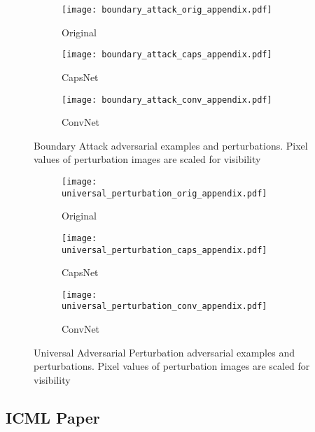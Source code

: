 \begin{figure}
	\centering
	
	\begin{subfigure}{.23\textwidth}
		\centering
		\texttt{[image: boundary\_attack\_orig\_appendix.pdf]}%
		\caption{Original}%
	\end{subfigure}%
	\begin{subfigure}{.36\textwidth}
		\centering
		\texttt{[image: boundary\_attack\_caps\_appendix.pdf]}%
		\caption{CapsNet}
	\end{subfigure}%
	\begin{subfigure}{.36\textwidth}
		\centering
		\texttt{[image: boundary\_attack\_conv\_appendix.pdf]}%
		\caption{ConvNet}
	\end{subfigure}
	\caption[Boundary Attack Adversarial Examples]{Boundary Attack adversarial examples and perturbations. Pixel values of perturbation images are scaled for visibility}
	\label{fig:boundary-img}
	
\end{figure}

\begin{figure}
	\centering
	
	\begin{subfigure}{.23\textwidth}
		\centering
		\texttt{[image: universal\_perturbation\_orig\_appendix.pdf]}%
		\caption{Original}%
	\end{subfigure}%
	\begin{subfigure}{.36\textwidth}
		\centering
		\texttt{[image: universal\_perturbation\_caps\_appendix.pdf]}%
		\caption{CapsNet}
	\end{subfigure}%
	\begin{subfigure}{.36\textwidth}
		\centering
		\texttt{[image: universal\_perturbation\_conv\_appendix.pdf]}%
		\caption{ConvNet}
	\end{subfigure}
	\caption[Universal Adversarial Perturbation Adversarial Examples]{Universal Adversarial Perturbation adversarial examples and perturbations. Pixel values of perturbation images are scaled for visibility}
	\label{fig:universal-img}
	
\end{figure}

\subsection{ICML Paper}

